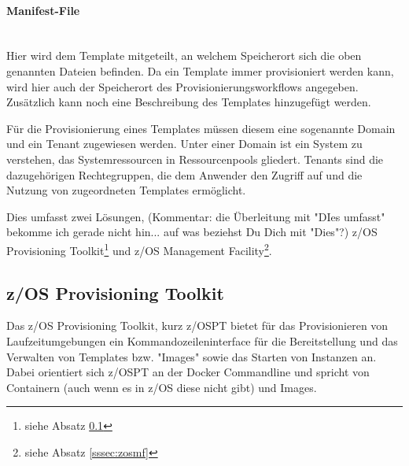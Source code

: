 \paragraph{\glqq Manifest-File\grqq} ~\\
Hier wird dem Template mitgeteilt, an welchem Speicherort sich die oben genannten Dateien befinden.
Da ein Template immer provisioniert werden kann, wird hier auch der Speicherort des Provisionierungsworkflows angegeben.
Zusätzlich kann noch eine Beschreibung des Templates hinzugefügt werden.
\cite{IBM.2019}

Für die Provisionierung eines Templates müssen diesem eine sogenannte \glqq Domain\grqq{} und ein \glqq Tenant\grqq{} zugewiesen werden.
Unter einer \glqq Domain\grqq{} ist ein System zu verstehen, das Systemressourcen in Ressourcenpools gliedert.
\glqq Tenants\grqq{} sind die dazugehörigen Rechtegruppen, die dem Anwender den Zugriff auf und die Nutzung von zugeordneten Templates ermöglicht.
\cite{Rotthove.2018}

Dies umfasst zwei Lösungen, (Kommentar: die Überleitung mit "DIes umfasst" bekomme ich gerade nicht hin... auf was beziehst Du Dich mit "Dies"?) \glqq z/OS Provisioning Toolkit\grqq\footnote{siehe Absatz \ref{sssec:zospt}} und \glqq z/OS Management Facility\grqq\footnote{siehe Absatz \ref{sssec:zosmf}}.

\subsection{z/OS Provisioning Toolkit}\label{sssec:zospt}


Das z/OS Provisioning Toolkit, kurz z/OSPT bietet für das Provisionieren von Laufzeitumgebungen ein Kommandozeileninterface für die Bereitstellung und das Verwalten von Templates bzw. "Images" sowie das Starten von Instanzen an. 
Dabei orientiert sich z/OSPT an der Docker Commandline und spricht von Containern (auch wenn es in z/OS diese nicht gibt) und Images.

